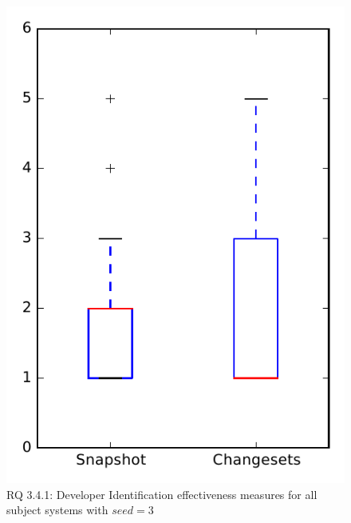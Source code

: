 
\begin{figure}
\centering
\includegraphics[height=0.4\textheight]{figures/dit_seed/rq1_overview_3}
\caption{RQ 3.4.1: Developer Identification effectiveness measures for all subject systems with $seed=3$}
\label{fig:dit_seed:rq1:overview}
\end{figure}
